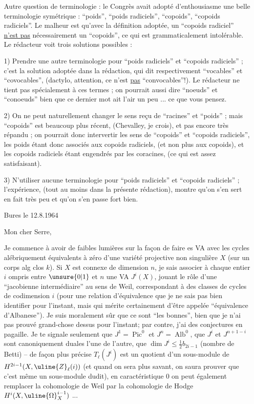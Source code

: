 Autre question de terminologie : le Congrès avait adopté d'enthousiasme une belle terminologie symétrique : ``poids'', ``poids radiciels'', ``copoids'', ``copoids radiciels''. Le malheur est qu'avec la définition adoptée, un ``copoids radiciel'' \uline{n'est pas} nécessairement un ``copoids'', ce qui est grammaticalement intolérable. Le rédacteur voit trois solutions possibles :

1) Prendre une autre terminologie pour ``poids radiciels'' et ``copoids radiciels'' ; c'est la solution adoptée dans la rédaction, qui dit respectivement ``vocables'' et ``covocables'', (dactylo, attention, ce n'est \uline{pas} ``convocables''!). Le rédacteur ne tient pas spécialement à ces termes ; on pourrait aussi dire ``noeuds'' et ``conoeuds'' bien que ce dernier mot ait l'air un peu ... ce que vous pensez.

2) On ne peut naturellement changer le sens reçu de ``racines'' et ``poids'' ; mais ``copoids'' est beaucoup plus récent, (Chevalley, je crois), et pas encore très répandu ; on pourrait donc intervertir les sens de ``copoids'' et ``copoids radiciels'', les poids étant donc associés aux copoids radiciels, (et non plus aux copoids), et les copoids radiciels étant engendrés par les coracines, (ce qui est assez satisfaisant).

3) N'utiliser aucune terminologie pour ``poids radiciels'' et ``copoids radiciels'' ; l'expérience, (tout au moins dans la présente rédaction), montre qu'on s'en sert en fait très peu et qu'on s'en passe fort bien.




Bures le 12.8.1964

Mon cher Serre,

Je commence à avoir de faibles lumières sur la façon de faire es VA avec les cycles alébriquement équivalents à zéro d'une variété projective non singulière $X$ (sur un corps alg clos $k$). Si $X$ est connexe de dimension $n$, je sais associer à chaque entier $i$ ompris entre $\unsure{0|1}$ et $n$ une VA $J^i(X)$, jouant le rôle d'une ``jacobienne intermédiaire'' au sens de Weil, correspondant à des classes de cycles de codimension $i$ (pour une relation d'équivalence que je ne sais pas bien identifier pour l'instant, mais qui mérite certainement d'être appelée ``équivalence d'Albanese''). Je suis moralement sûr que ce sont ``les bonnes'', bien que je n'ai pas prouvé grand-chose dessus pour l'instant; par contre, j'ai des conjectures en pagaille. Je te signale seulement que $J^1=\operatorname{Pic}^{0}$ et $J^n=\operatorname{Alb}^{0}$, que $J^i$ et $J^{n+1-i}$ sont canoniquement duales l'une de l'autre, que $\dim J^i\leq\frac12 b_{2i-1}$ (nombre de Betti) -- de façon plus précise $T_{\ell}(J^i)$ est un quotient d'un sous-module de $H^{2i-1}(X,\uline{Z}_{\ell}(i))$ (et quand on sera plus savant, on saura prouver que c'est même un sous-module dudit), en caractéristique $0$ on peut également remplacer la cohomologie de Weil par la cohomologie de Hodge $H^i(X,\uline{\Omega}^{i-1}_X)$ ...

